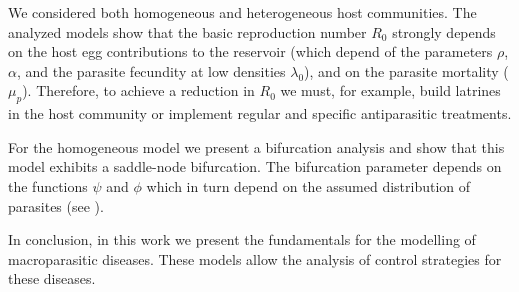 \documentclass[12pt,a4paper]{article}
\theoremstyle{plain}%
\theoremstyle{definition}
\theoremstyle{remark}
\begin{document}
We considered both homogeneous and heterogeneous host communities. 
The analyzed models show that the basic reproduction number $R_0$ strongly depends 
on the %
host egg contributions to the reservoir (which depend of the parameters $\rho$, $\alpha$, and the parasite fecundity at low densities $\lambda_0 $), and on the parasite mortality ($\mu_p$). 
Therefore, to achieve a reduction in $R_0$ we must, for example, build latrines in the host community or implement regular and specific antiparasitic treatments.


For the homogeneous model we present a bifurcation analysis and show that this model exhibits a saddle-node bifurcation.
The bifurcation parameter depends on the functions $\psi$ and $\phi$ which in turn depend on the assumed
distribution of parasites (see \cite{lopez2022general}).


In conclusion, in this work we present the fundamentals for the modelling of macroparasitic diseases. These models allow the analysis of control strategies for these diseases. 

%
%	
%
%
%
%
\end{document}
